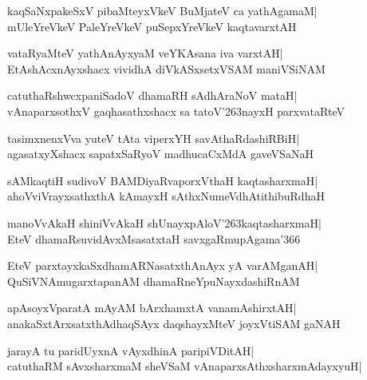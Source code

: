 \documentclass[twoside,12pt,openright]{book}
\def\S{\char'263}
\newcounter{shloka}[chapter]
\begin{document}
\begin{shloka}%
kaqSaNxpakeSxV pibaMteyxVkeV BuMjateV ca yathAgamaM|\\
mUleYreVkeV PaleYreVkeV puSepxYreVkeV kaqtavarxtAH
\end{shloka}

\begin{shloka}%
vataRyaMteV yathAnAyxyaM veYKAsana iva varxtAH|\\
EtAshAcxnAyxshacx vividhA diVkASxsetxVSAM maniVSiNAM
\end{shloka}

\begin{shloka}%
catuthaRshwcxpaniSadoV dhamaRH sAdhAraNoV mataH|\\
vAnaparxsothxV gaqhasathxshacx sa tatoV\S nayxH parxvataRteV
\end{shloka}

\begin{shloka}%
tasimxnenxVva yuteV tAta viperxYH savAthaRdashiRBiH|\\
agasatxyXshacx sapatxSaRyoV madhucaCxMdA gaveVSaNaH
\end{shloka}

\begin{shloka}%
sAMkaqtiH sudivoV BAMDiyaRvaporxVthaH kaqtasharxmaH|\\
ahoVviVrayxsathxthA kAmayxH sAthxNumeVdhAtithibuRdhaH
\end{shloka}

\begin{shloka}%
manoVvAkaH shiniVvAkaH shUnayxpAloV\S kaqtasharxmaH|\\
EteV dhamaRsuvidAvxMsasatxtaH savxgaRmupAgama\char'366
\end{shloka}

\begin{shloka}%
EteV parxtayxkaSxdhamARNasatxthAnAyx yA varAMganAH|\\
QuSiVNAmugarxtapanAM dhamaRneYpuNayxdashiRnAM
\end{shloka}

\begin{shloka}%
apAsoyxVparatA mAyAM bArxhamxtA vanamAshirxtAH|\\
anakaSxtArxsatxthAdhaqSAyx daqshayxMteV joyxVtiSAM gaNAH
\end{shloka}

\begin{shloka}%
jarayA tu paridUyxnA vAyxdhinA paripiVDitAH|\\
catuthaRM sAvxsharxmaM sheVSaM vAnaparxsAthxsharxmAdayxyuH|
\end{shloka}
\end{document}
